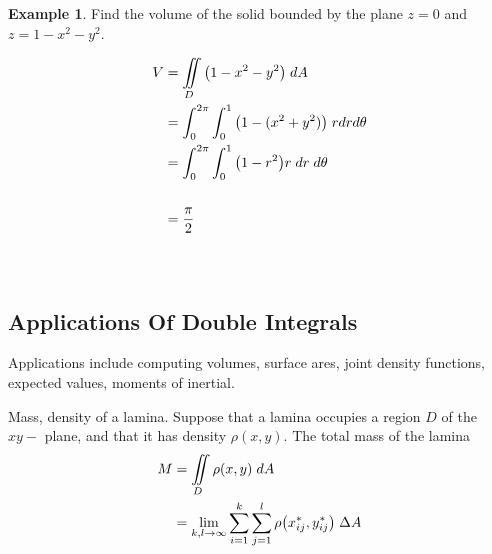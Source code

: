 \documentclass[11pt,a4paper]{article}
\theoremstyle{definition}
\newtheorem{exa}[thm]{Example}
\begin{document}
\begin{exa}


Find the volume of the solid bounded by the plane $z = 0$ and $z = 1-x^2 -y^2 $.


\begin{figure}[H]
\centering
{}
\end{figure}

\begin{align*}
V & = \iint\limits_D \big(1-x^2-y^2\big)\hspace{0.1cm}dA\\
& = \int^{2\pi}_0\int^1_0\big(1 - (x^2 + y^2)\big)\hspace{0.1cm}rdrd\theta\\
& = \int^{2\pi}_0\int^1_0 \big( 1 - r^2\big) r\hspace{0.1cm}dr\hspace{0.1cm} d\theta\\\\
& = \frac{\pi}{2}\\\\\\
\end{align*}
\end{exa}

{\color[wave]{485}\subsection{Applications Of Double Integrals}}

Applications include computing volumes, surface ares, joint density functions, expected values, moments of inertial.


Mass, density of a lamina. Suppose that a lamina occupies a region $D$ of the $xy-$ plane, and that it has density $\rho (x,y)$. The total mass of the lamina 
\begin{align*}
M & = \iint\limits_D \rho (x,y)\hspace{0.1cm}dA\\
& =  \lim\limits_{k,l\rightarrow \infty} \sum^k_{i=1}\sum^l_{j=1} \rho \big(x_{ij}^*,y^*_{ij}\big)\hspace{0.1cm}\Delta A\\ 
\end{align*}
\end{document}
